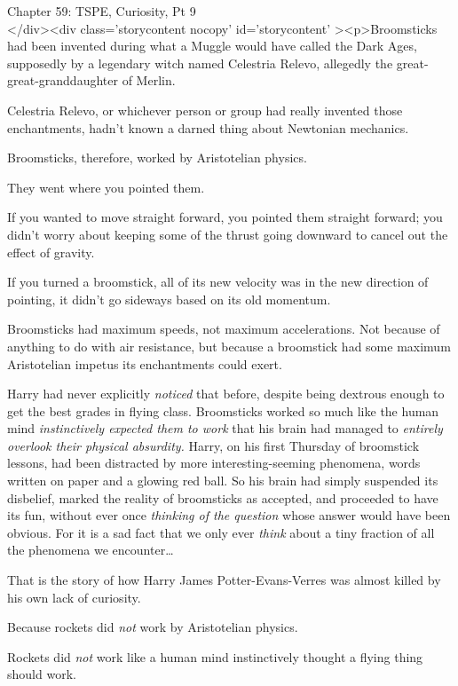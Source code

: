 
Chapter 59: TSPE, Curiosity, Pt 9\\
</div><div  class='storycontent nocopy' id='storycontent' ><p>Broomsticks had 
been invented during what a Muggle would have called the Dark Ages, supposedly 
by a legendary witch named Celestria Relevo, allegedly the 
great-great-granddaughter of Merlin.

Celestria Relevo, or whichever person or group had really invented those 
enchantments, hadn't known a darned thing about Newtonian mechanics.

Broomsticks, therefore, worked by Aristotelian physics.

They went where you pointed them.

If you wanted to move straight forward, you pointed them straight forward; you 
didn't worry about keeping some of the thrust going downward to cancel out the 
effect of gravity.

If you turned a broomstick, all of its new velocity was in the new direction of 
pointing, it didn't go sideways based on its old momentum.

Broomsticks had maximum speeds, not maximum accelerations. Not because of 
anything to do with air resistance, but because a broomstick had some maximum 
Aristotelian impetus its enchantments could exert.

Harry had never explicitly \emph{noticed} that before, despite being dextrous 
enough to get the best grades in flying class. Broomsticks worked so much like 
the human mind \emph{instinctively expected them to work} that his brain had 
managed to \emph{entirely overlook their physical absurdity.} Harry, on his 
first Thursday of broomstick lessons, had been distracted by more 
interesting-seeming phenomena, words written on paper and a glowing red ball. 
So his brain had simply suspended its disbelief, marked the reality of 
broomsticks as accepted, and proceeded to have its fun, without ever once 
\emph{thinking of the question} whose answer would have been obvious. For it is 
a sad fact that we only ever \emph{think} about a tiny fraction of all the 
phenomena we encounter{\ldots}

That is the story of how Harry James Potter-Evans-Verres was almost killed by 
his own lack of curiosity.

Because rockets did \emph{not} work by Aristotelian physics.

Rockets did \emph{not} work like a human mind instinctively thought a flying 
thing should work.

